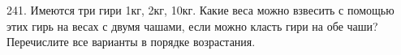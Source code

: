 241. Имеются три гири 1кг, 2кг, 10кг. Какие веса можно взвесить с помощью этих гирь на весах с двумя чашами, если можно класть гири на обе чаши? Перечислите все варианты в порядке возрастания.\\
